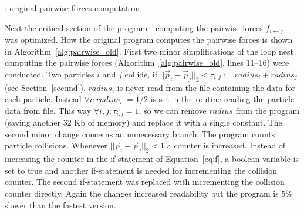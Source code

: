 \documentclass[twoside,11pt]{article}
\begin{document}
\begin{algorithm} %
  \caption{: original pairwise forces computation}
  \label{alg:pairwise_old}

  \begin{algorithmic}[1]

      \ENDFOR
    \ENDFOR

      \ENDFOR
    \ENDFOR

      \ENDFOR
    \ENDFOR

  \end{algorithmic}
\end{algorithm} %

Next the critical section of the program---computing the pairwise
forces $f_{i \leftarrow j}$---was optimized.
How the original program computes the pairwise forces is shown in
Algorithm~\ref{alg:pairwise_old}.
First two minor simplifications of the loop nest computing the
pairwise forces (Algorithm~\ref{alg:pairwise_old}, lines 11--16)
were conducted.
Two particles $i$ and $j$ collide, if $||\vec{p}_i - \vec{p}_j||_2 <
\tau_{i,j} := radius_i + radius_j$ (see Section~\ref{sec:md}).
$radius_i$ is never read from the file containing the data for each
particle.
Instead $\forall i: radius_i := 1/2$ is set in the routine reading
the particle data from file.
This way $\forall i,j: \tau_{i,j} = 1$, so we can remove $radius$ from
the program (saving another 32 Kb of memory) and replace it with a
single constant.
The second minor change concerns an unnecessary branch.
The program counts particle collisions.
Whenever $||\vec{p}_i - \vec{p}_j||_2 < 1$ a counter is increased.
Instead of increasing the counter in the if-statement of
Equation~\ref{eq:f}, a boolean variable is set to true and another
if-statement is needed for incrementing the collision counter.
The second if-statement was replaced with incrementing the collision
counter directly.
Again the changes increased readability but the program is 5\% slower
than the fastest version.
\end{document}
